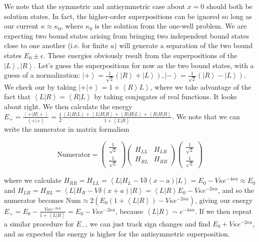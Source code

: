 \documentclass{report}
\begin{document}
We note that the symmetric and antisymmetric case about $x=0$ should both be solution states. In fact, the higher-order superpositions can be ignored so long as our current $\kappa \approx \kappa_0$, where $\kappa_0$ is the solution from the one-well problem. We are expecting two bound states arising from bringing two independent bound states close to one another (i.e. for finite $a$) will generate a separation of the two bound states $E_0 \pm \epsilon$. These energies obviously result from the superpositions of the $\left|L\right>,\left|R\right>$. Let's guess the superpositions for now as the two bound states, with a guess of a normalization: $\left|+\right> = \frac{1}{\sqrt{2}}\left(\left|R\right> + \left|L\right>\right), \left|-\right> = \frac{1}{\sqrt{2}}\left(\left|R\right> - \left|L\right>\right)$. We check our by taking $\left|+\right|\left.+\right> = 1 + \left<R\right>\left.L\right>$, where we take advantage of the fact that $\left<L|R\right> = \left<R|L\right>$ by taking conjugates of real functions. It looks about right. We then calculate the energy $E_+ = \frac{\left<+|H|+\right>}{\left<+|+\right>} = \frac{1}{2}\frac{\left<L|H|L\right> + \left<L|H|R\right>+\left<R|H|L\right> + \left<R|H|R\right>}{1+\left<L|R\right>}$. We note that we can write the numerator in matrix formalism 

$$\text{Numerator}=\begin{pmatrix}\frac{1}{\sqrt{2}}\\\frac{1}{\sqrt{2}}\end{pmatrix}\begin{pmatrix}H_{LL} & H_{LR}\\H_{RL} & H_{RR}\end{pmatrix}\begin{pmatrix}\frac{1}{\sqrt{2}}\\\frac{1}{\sqrt{2}}\end{pmatrix}$$

where we calculate $H_{RR} = H_{LL} = \left<L|H_L - V\delta(x-a)|L\right> = E_0 - V\kappa e^{-4\kappa a} \approx E_0$ and $H_{LR} = H_{RL} = \left<L|H_R-V\delta(x+a)|R\right> = \left<L|R\right>E_0 - V\kappa e^{-2\kappa a}$, and so the numerator becomes $\text{Num} \approx 2\left(E_0(1+\left<L|R\right>) - V\kappa e^{-2\kappa a}\right)$, giving our energy $E_+ = E_0 - \frac{V\kappa e^{-2\kappa a}}{1+\left<L|R\right>} = E_0 - V\kappa e^{-2\kappa a}$, because $\left<L|R\right> \sim e^{-4\kappa a}$. If we then repeat a similar procedure for $E_-$, we can just track sign changes and find $E_0 + V\kappa e^{-2\kappa a}$, and as expected the energy is higher for the antisymmetric superposition.
\end{document}
